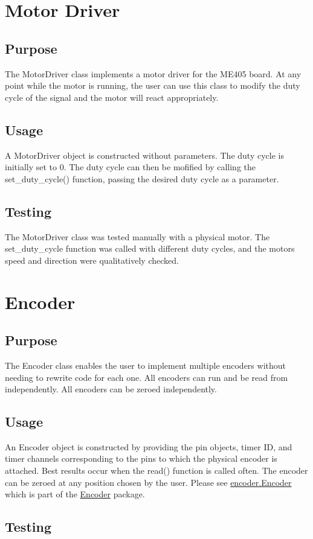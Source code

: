 \hypertarget{index_motor_driver}{}\section{Motor Driver}\label{index_motor_driver}
\hypertarget{index_purpose}{}\subsection{Purpose}\label{index_purpose}
The Motor\+Driver class implements a motor driver for the M\+E405 board. At any point while the motor is running, the user can use this class to modify the duty cycle of the signal and the motor will react appropriately.\hypertarget{index_usage}{}\subsection{Usage}\label{index_usage}
A Motor\+Driver object is constructed without parameters. The duty cycle is initially set to 0. The duty cycle can then be mofified by calling the set\+\_\+duty\+\_\+cycle() function, passing the desired duty cycle as a parameter.\hypertarget{index_testing}{}\subsection{Testing}\label{index_testing}
The Motor\+Driver class was tested manually with a physical motor. The set\+\_\+duty\+\_\+cycle function was called with different duty cycles, and the motor\textquotesingle{}s speed and direction were qualitatively checked.\hypertarget{index_encoder}{}\section{Encoder}\label{index_encoder}
\hypertarget{index_purpose}{}\subsection{Purpose}\label{index_purpose}
The Encoder class enables the user to implement multiple encoders without needing to rewrite code for each one. All encoders can run and be read from independently. All encoders can be zeroed independently.\hypertarget{index_usage}{}\subsection{Usage}\label{index_usage}
An Encoder object is constructed by providing the pin objects, timer ID, and timer channels corresponding to the pins to which the physical encoder is attached. Best results occur when the read() function is called often. The encoder can be zeroed at any position chosen by the user. Please see \mbox{\hyperlink{classencoder_1_1_encoder}{encoder.\+Encoder}} which is part of the \mbox{\hyperlink{index_encoder}{Encoder}} package.\hypertarget{index_testing}{}\subsection{Testing}\label{index_testing}
